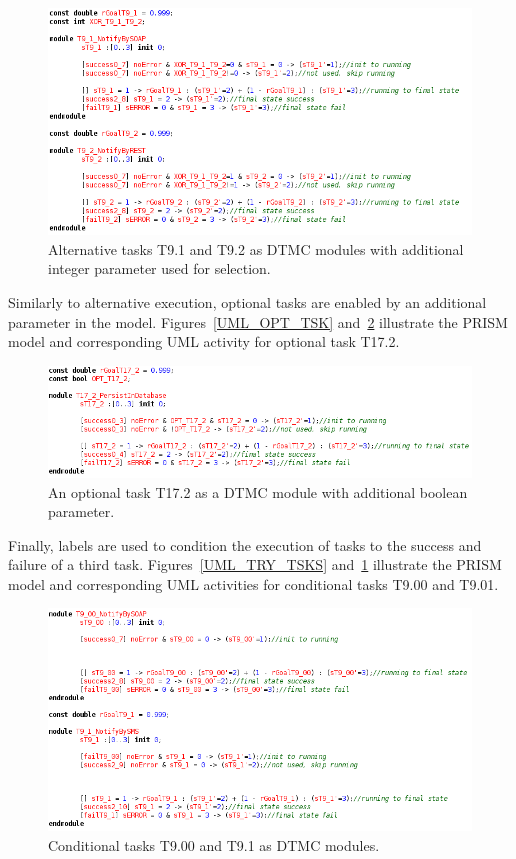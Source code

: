 \begin{figure}[ht]
\centering
\includegraphics[width=1\textwidth]{imgs/PRISM_ALT_TSKS.png}
\caption{Alternative tasks T9.1 and T9.2 as DTMC modules with additional integer parameter used for selection.}
\label{fig:PRISM_ALT_TSKS}
\end{figure}

Similarly to alternative execution, optional tasks are enabled by an additional parameter in the model. Figures~\ref{UML_OPT_TSK} and~\ref{fig:PRISM_OPT_TSK} illustrate the PRISM model and corresponding UML activity for optional task T17.2.

\begin{figure}[ht]
\centering
\includegraphics[width=1\textwidth]{imgs/PRISM_OPT_TSK.png}
\caption{An optional task T17.2 as a DTMC module with additional boolean parameter.}
\label{fig:PRISM_OPT_TSK}
\end{figure}

Finally, labels are used to condition the execution of tasks to the success and failure of a third task. Figures~\ref{UML_TRY_TSKS} and~\ref{fig:PRISM_ALT_TSKS} illustrate the PRISM model and corresponding UML activities for conditional tasks T9.00 and T9.01.

\begin{figure}[h!]
\centering
\includegraphics[width=1\textwidth]{imgs/PRISM_TRY_TSKS.png}
\caption{Conditional tasks T9.00 and T9.1 as DTMC modules.}
\label{fig:PRISM_TRY_TSKS}
\end{figure}

